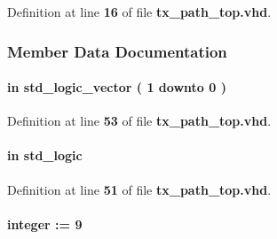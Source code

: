 Definition at line {\bf 16} of file {\bf tx\+\_\+path\+\_\+top.\+vhd}.



\subsubsection{Member Data Documentation}
\paragraph[{ch\+\_\+en}]{ {\bfseries \textcolor{keywordflow}{in}\textcolor{vhdlchar}{ }} {\bfseries \textcolor{comment}{std\+\_\+logic\+\_\+vector}\textcolor{vhdlchar}{ }\textcolor{vhdlchar}{(}\textcolor{vhdlchar}{ }\textcolor{vhdlchar}{ } \textcolor{vhdldigit}{1} \textcolor{vhdlchar}{ }\textcolor{keywordflow}{downto}\textcolor{vhdlchar}{ }\textcolor{vhdlchar}{ } \textcolor{vhdldigit}{0} \textcolor{vhdlchar}{ }\textcolor{vhdlchar}{)}\textcolor{vhdlchar}{ }} \hspace{0.3cm}{\ttfamily [Port]}}\label{classtx__path__top_a6494f316f504075c4ccf47146756d576}


Definition at line {\bf 53} of file {\bf tx\+\_\+path\+\_\+top.\+vhd}.

\paragraph[{ddr\+\_\+en}]{ {\bfseries \textcolor{keywordflow}{in}\textcolor{vhdlchar}{ }} {\bfseries \textcolor{comment}{std\+\_\+logic}\textcolor{vhdlchar}{ }} \hspace{0.3cm}{\ttfamily [Port]}}\label{classtx__path__top_adbfe05e6692f69f8e592df06c6055f0a}


Definition at line {\bf 51} of file {\bf tx\+\_\+path\+\_\+top.\+vhd}.

\paragraph[{decomp\+\_\+fifo\+\_\+size}]{ {\bfseries \textcolor{vhdlchar}{ }} {\bfseries \textcolor{comment}{integer}\textcolor{vhdlchar}{ }\textcolor{vhdlchar}{ }\textcolor{vhdlchar}{\+:}\textcolor{vhdlchar}{=}\textcolor{vhdlchar}{ }\textcolor{vhdlchar}{ } \textcolor{vhdldigit}{9} \textcolor{vhdlchar}{ }} \hspace{0.3cm}{\ttfamily [Generic]}}\label{classtx__path__top_a461d67b8d13cf91548bb3458b53b723e}


